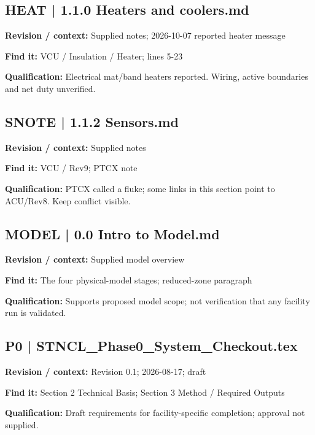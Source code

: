 \documentclass[11pt]{article}
\begin{document}
\begin{minipage}{\textwidth}\small
\subsection*{HEAT | 1.1.0 Heaters and coolers.md}
\textbf{Revision / context:} Supplied notes; 2026-10-07 reported heater message\par
\textbf{Find it:} VCU / Insulation / Heater; lines 5-23\par
\textbf{Qualification:} Electrical mat/band heaters reported. Wiring, active boundaries and net duty unverified.\par
\end{minipage}\par\vspace{5pt}
\par
\begin{minipage}{\textwidth}\small
\subsection*{SNOTE | 1.1.2 Sensors.md}
\textbf{Revision / context:} Supplied notes\par
\textbf{Find it:} VCU / Rev9; PTCX note\par
\textbf{Qualification:} PTCX called a fluke; some links in this section point to ACU/Rev8. Keep conflict visible.\par
\end{minipage}\par\vspace{5pt}
\begin{minipage}{\textwidth}\small
\subsection*{MODEL | 0.0 Intro to Model.md}
\textbf{Revision / context:} Supplied model overview\par
\textbf{Find it:} The four physical-model stages; reduced-zone paragraph\par
\textbf{Qualification:} Supports proposed model scope; not verification that any facility run is validated.\par
\end{minipage}\par\vspace{5pt}
\begin{minipage}{\textwidth}\small
\subsection*{P0 | STNCL\_\allowbreak{}Phase0\_\allowbreak{}System\_\allowbreak{}Checkout.tex}
\textbf{Revision / context:} Revision 0.1; 2026-08-17; draft\par
\textbf{Find it:} Section 2 Technical Basis; Section 3 Method / Required Outputs\par
\textbf{Qualification:} Draft requirements for facility-specific completion; approval not supplied.\par
\end{minipage}\par\vspace{5pt}
\end{document}
